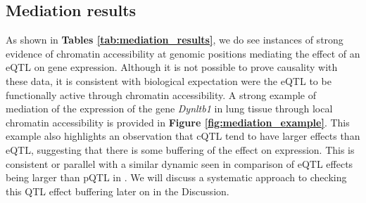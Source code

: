 \subsection{Mediation results}

As shown in \textbf{Tables \ref{tab:mediation_results}}, we do see instances of strong evidence of chromatin accessibility at genomic positions mediating the effect of an eQTL on gene expression. Although it is not possible to prove causality with these data, it is consistent with biological expectation were the eQTL to be functionally active through chromatin accessibility. A strong example of mediation of the expression of the gene \textit{Dynltb1} in lung tissue through local chromatin accessibility is provided in \textbf{Figure \ref{fig:mediation_example}}. This example also highlights an observation that cQTL tend to have larger effects than eQTL, suggesting that there is some buffering of the effect on expression. This is consistent or parallel with a similar dynamic seen in comparison of eQTL effects being larger than pQTL in \cite{Battle2015}. We will discuss a systematic approach to checking this QTL effect buffering later on in the Discussion.


